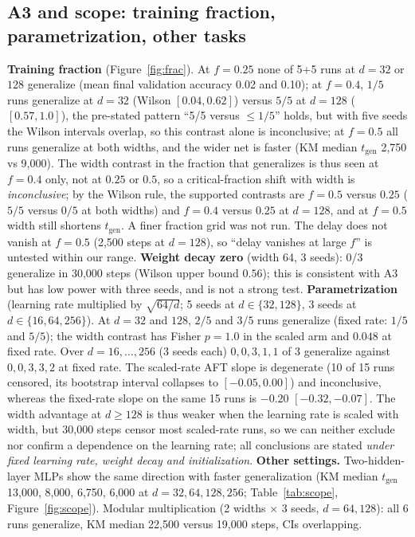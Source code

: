 \documentclass{article}
\newcommand{\tgen}{t_{\mathrm{gen}}}
\begin{document}
\subsection{A3 and scope: training fraction, parametrization, other tasks}
\label{sec:a3}
\textbf{Training fraction} (Figure~\ref{fig:frac}). At $f=0.25$ none of 5+5 runs at $d=32$ or $128$ generalize (mean final validation accuracy 0.02 and 0.10); at $f=0.4$, $1/5$ runs generalize at $d=32$ (Wilson $[0.04,0.62]$) versus $5/5$ at $d=128$ ($[0.57,1.0]$), the pre-stated pattern ``5/5 versus $\le1/5$'' holds, but with five seeds the Wilson intervals overlap, so this contrast alone is inconclusive; at $f=0.5$ all runs generalize at both widths, and the wider net is faster (KM median $\tgen$ 2{,}750 vs 9{,}000). The width contrast in the fraction that generalizes is thus seen at $f=0.4$ only, not at $0.25$ or $0.5$, so a critical-fraction shift with width is \emph{inconclusive}; by the Wilson rule, the supported contrasts are $f=0.5$ versus $0.25$ ($5/5$ versus $0/5$ at both widths) and $f=0.4$ versus $0.25$ at $d=128$, and at $f=0.5$ width still shortens $\tgen$. A finer fraction grid was not run. The delay does not vanish at $f=0.5$ (2{,}500 steps at $d=128$), so ``delay vanishes at large $f$'' is untested within our range.
\textbf{Weight decay zero} (width 64, 3 seeds): 0/3 generalize in 30{,}000 steps (Wilson upper bound $0.56$); this is consistent with A3 but has low power with three seeds, and is not a strong test.
\textbf{Parametrization} (learning rate multiplied by $\sqrt{64/d}$; 5 seeds at $d\in\{32,128\}$, 3 seeds at $d\in\{16,64,256\}$). At $d=32$ and $128$, $2/5$ and $3/5$ runs generalize (fixed rate: $1/5$ and $5/5$); the width contrast has Fisher $p=1.0$ in the scaled arm and $0.048$ at fixed rate. Over $d=16,\dots,256$ (3 seeds each) $0,0,3,1,1$ of 3 generalize against $0,0,3,3,2$ at fixed rate. The scaled-rate AFT slope is degenerate (10 of 15 runs censored, its bootstrap interval collapses to $[-0.05,0.00]$) and inconclusive, whereas the fixed-rate slope on the same 15 runs is $-0.20$ $[-0.32,-0.07]$. The width advantage at $d\ge128$ is thus weaker when the learning rate is scaled with width, but 30{,}000 steps censor most scaled-rate runs, so we can neither exclude nor confirm a dependence on the learning rate; all conclusions are stated \emph{under fixed learning rate, weight decay and initialization}.
\textbf{Other settings.} Two-hidden-layer MLPs show the same direction with faster generalization (KM median $\tgen$ 13{,}000, 8{,}000, 6{,}750, 6{,}000 at $d=32,64,128,256$; Table~\ref{tab:scope}, Figure~\ref{fig:scope}). Modular multiplication (2 widths $\times$ 3 seeds, $d=64,128$): all 6 runs generalize, KM median 22{,}500 versus 19{,}000 steps, CIs overlapping.
\end{document}
